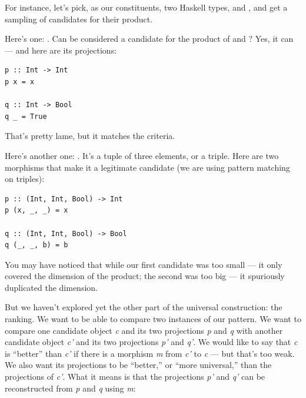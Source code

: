 \begin{figure}[H]
\centering
{}
\end{figure}

\noindent
For instance, let's pick, as our constituents, two Haskell types,
 and , and get a sampling of candidates for
their product.

Here's one: . Can  be considered a candidate for
the product of  and ? Yes, it can --- and here
are its projections:

\begin{Verbatim}[commandchars=\\\{\}]
p :: Int -> Int
p x = x

q :: Int -> Bool
q _ = True
\end{Verbatim}
That's pretty lame, but it matches the criteria.

Here's another one: . It's a tuple of three
elements, or a triple. Here are two morphisms that make it a legitimate
candidate (we are using pattern matching on triples):

\begin{Verbatim}[commandchars=\\\{\}]
p :: (Int, Int, Bool) -> Int
p (x, _, _) = x

q :: (Int, Int, Bool) -> Bool
q (_, _, b) = b
\end{Verbatim}
You may have noticed that while our first candidate was too small --- it
only covered the  dimension of the product; the second was
too big --- it spuriously duplicated the  dimension.

But we haven't explored yet the other part of the universal
construction: the ranking. We want to be able to compare two instances
of our pattern. We want to compare one candidate object \emph{c} and its
two projections \emph{p} and \emph{q} with another candidate object
\emph{c'} and its two projections \emph{p'} and \emph{q'}. We would like
to say that \emph{c} is ``better'' than \emph{c'} if there is a morphism
\emph{m} from \emph{c'} to \emph{c} --- but that's too weak. We also
want its projections to be ``better,'' or ``more universal,'' than the
projections of \emph{c'}. What it means is that the projections
\emph{p'} and \emph{q'} can be reconstructed from \emph{p} and \emph{q}
using \emph{m}:

